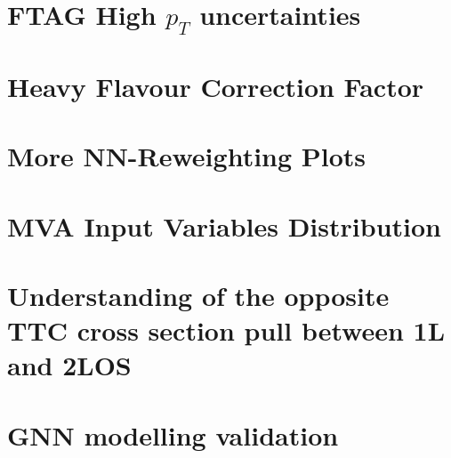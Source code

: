 \documentclass[NOTE, atlasdraft=true, texlive=2016, UKenglish]{atlasdoc}
\begin{document}
\section{FTAG High $p_T$ uncertainties}
\label{app:FTAG_uncertainties}



\FloatBarrier
\section{Heavy Flavour Correction Factor}
\label{app:HFCorr_studies}


\FloatBarrier
\section{More NN-Reweighting Plots}
\label{app:NNRewPlots}


\FloatBarrier
\section{MVA Input Variables Distribution}
\label{app:MVAInput}


\FloatBarrier
\section{Understanding of the opposite TTC cross section pull between 1L and 2LOS}
\label{app:TTC_pull}


\FloatBarrier
\section{GNN modelling validation}
\label{app:GNN_modelling}

\end{document}
